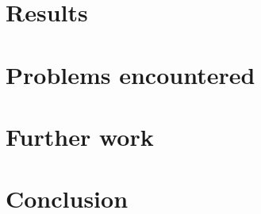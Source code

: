 \documentclass{../acm_proc_article-me11_tweaked}
\begin{document}
\section{Results}

\section{Problems encountered}

\section{Further work}

\section{Conclusion}



\end{document}
